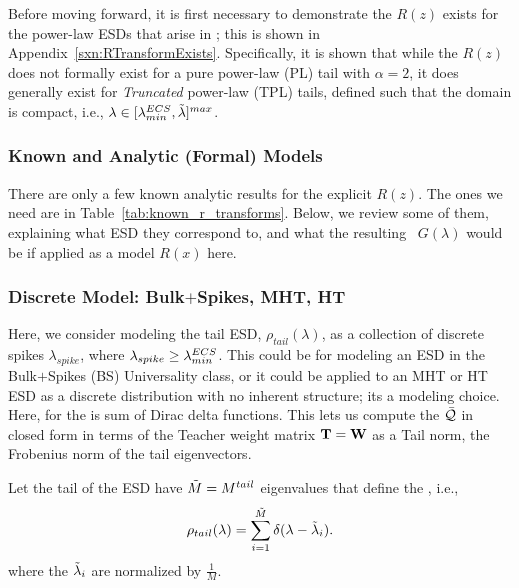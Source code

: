 Before moving forward, it is first necessary to demonstrate the \RTransform $R(z)$ exists for the power-law ESDs that arise in \SETOL; this is shown in Appendix~\ref{sxn:RTransformExists}.  Specifically, it is shown that while the $R(z)$ does not formally exist for a pure power-law (PL) tail with $\alpha=2$, it does generally exist for \emph{Truncated} power-law (TPL) tails, defined such that the domain is compact, i.e., $\lambda\in[\lambda^{ECS}_{min}, \tilde{\lambda}]^{max}$. 

\subsubsection{Known \RTransforms and Analytic (Formal) Models}
\label{sxn:r_transforms:known_r_transforms}

There are only a few known analytic results for the explicit \RTransform $R(z)$.
The ones we need are in Table~\ref{tab:known_r_transforms}.
Below, we review some of them, explaining what ESD they correspond to,
and what the resulting \GEN~$G(\lambda)$ would be if applied
as a model $R(x)$ here.



\subsubsection{Discrete Model: Bulk\texorpdfstring{$+$}{+}Spikes, MHT, HT}

Here, we consider modeling the tail ESD, $\rho_{tail}(\lambda)$, as a collection
of discrete spikes $\lambda_{spike}$, 
where $\lambda_{spike}\ge \lambda^{ECS}_{min}$.
This could be for modeling an ESD in the Bulk$+$Spikes (BS) \HTSR Universality class,
or it could be applied to an MHT or HT ESD as a discrete distribution with
no inherent structure; its a modeling choice.
Here, \RTransform for the \ECS is sum of Dirac delta functions.
This lets us compute the \LayerQuality $\bar{\mathcal{Q}}$ in closed form in terms of the Teacher weight matrix
${\mathbf{T}}={\mathbf{W}}$ as a Tail norm, the Frobenius norm of the tail eigenvectors.

Let the tail of the ESD have $\tilde{M} = M^{tail}$ eigenvalues that define the \ECS, i.e.,  
\begin{equation}
\label{eqn:spikes_model_0}
\rho_{tail}(\lambda)=\sum_{i=1}^{\tilde{M}}\delta(\lambda-\tilde{\lambda}_{i}) .
\end{equation}
where the $\tilde{\lambda}_{i}$ are normalized by $\tfrac{1}{M}$.

